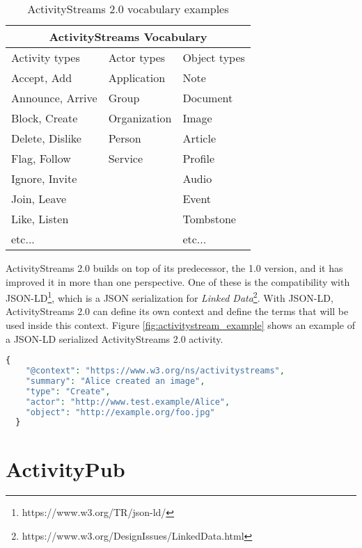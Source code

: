 \begin{table}[!ht]
  \centering
  \begin{tabular}{|p{4cm}|p{4cm}|p{4cm}| }
    \hline
    \multicolumn{3}{|c|}{ActivityStreams Vocabulary} \\
    \hline
    Activity types & Actor types & Object types \\
    \hline
      Accept, Add & Application & Note \\
      Announce, Arrive & Group & Document \\ 
      Block, Create & Organization & Image \\
      Delete, Dislike & Person & Article \\
      Flag, Follow & Service & Profile \\
      Ignore, Invite & & Audio \\
      Join, Leave & & Event \\
      Like, Listen & & Tombstone \\
      etc... & & etc... \\
    \hline
  \end{tabular}
  \caption{ActivityStreams 2.0 vocabulary examples}
  \label{table:activitystreams_vocabulary}
\end{table}

ActivityStreams 2.0 builds on top of its predecessor, the 1.0 version, and it has improved it in more than one perspective. One of these is the compatibility with JSON-LD\footnote{https://www.w3.org/TR/json-ld/}, which is a JSON serialization for \emph{Linked Data}\footnote{https://www.w3.org/DesignIssues/LinkedData.html}. With JSON-LD, ActivityStreams 2.0 can define its own context and define the terms that will be used inside this context. Figure \ref{fig:activitystream_example} shows an example of a JSON-LD serialized ActivityStreams 2.0 activity. 

\lstset{style=JSONStyle}
\begin{lstlisting}[language=PHP, caption=Example of activity \cite{snell_prodromou_2017}, label=fig:activitystream_example, float=h]
  {
    "@context": "https://www.w3.org/ns/activitystreams",
    "summary": "Alice created an image",
    "type": "Create",
    "actor": "http://www.test.example/Alice",
    "object": "http://example.org/foo.jpg"
  }
\end{lstlisting}


\section{ActivityPub}


